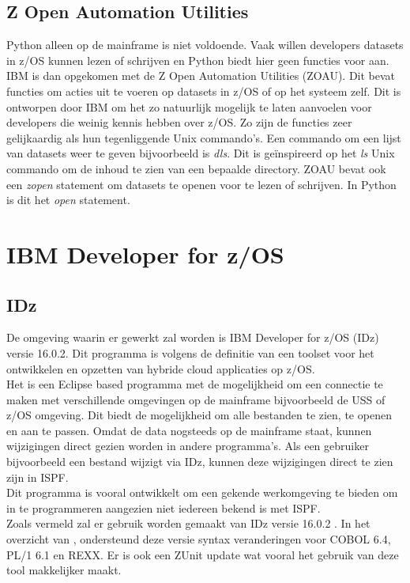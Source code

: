 \subsection{Z Open Automation Utilities}
Python alleen op de mainframe is niet voldoende. Vaak willen developers datasets in z/OS kunnen lezen of schrijven en Python biedt hier geen functies voor aan. IBM is dan opgekomen met de Z Open Automation Utilities (ZOAU). Dit bevat functies om acties uit te voeren op datasets in z/OS of op het systeem zelf. Dit is ontworpen door IBM om het zo natuurlijk mogelijk te laten aanvoelen voor developers die weinig kennis hebben over z/OS. Zo zijn de functies zeer gelijkaardig als hun tegenliggende Unix commando's. Een commando om een lijst van datasets weer te geven bijvoorbeeld is \textit{dls}. Dit is geïnspireerd op het \textit{ls} Unix commando om de inhoud te zien van een bepaalde directory. ZOAU bevat ook een \textit{zopen} statement om datasets te openen voor te lezen of schrijven. In Python is dit het \textit{open} statement. \autocite{IBM2023a}

\section{IBM Developer for z/OS}
\label{sec:IBM Developer for z/OS (IDz)}
\subsection{IDz}
De omgeving waarin er gewerkt zal worden is IBM Developer for z/OS (IDz) versie 16.0.2. Dit programma is volgens de definitie van \textcite{Spohn2023} een toolset voor het ontwikkelen en opzetten van hybride cloud applicaties op z/OS. \\
Het is een Eclipse based programma met de mogelijkheid om een connectie te maken met verschillende omgevingen op de mainframe bijvoorbeeld de USS of z/OS omgeving. Dit biedt de mogelijkheid om alle bestanden te zien, te openen en aan te passen. Omdat de data nogsteeds op de mainframe staat, kunnen wijzigingen direct gezien worden in andere programma's. Als een gebruiker bijvoorbeeld een bestand wijzigt via IDz, kunnen deze wijzigingen direct te zien zijn in ISPF. \\
Dit programma is vooral ontwikkelt om een gekende werkomgeving te bieden om in te programmeren aangezien niet iedereen bekend is met ISPF. \\

Zoals vermeld zal er gebruik worden gemaakt van IDz versie 16.0.2 . In het overzicht van \textcite{IBM2024}, ondersteund deze versie syntax veranderingen voor COBOL 6.4, PL/1 6.1 en REXX. Er is ook een ZUnit update wat vooral het gebruik van deze tool makkelijker maakt. \\

